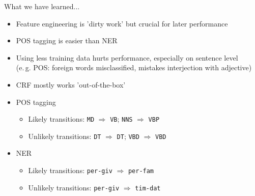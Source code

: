 \begin{frame}{What we have learned...}{}
	\begin{itemize}
		\item Feature engineering is 'dirty work' but crucial for later performance
		\item POS tagging is easier than NER
		\item Using less training data hurts performance, especially on sentence level \\
			(e.\,g. POS: foreign words misclassified, mistakes interjection with adjective)
		\item CRF mostly works 'out-of-the-box'
		\item POS tagging
		\begin{itemize}
			\item Likely transitions: \texttt{MD} $\Rightarrow$ \texttt{VB}; \texttt{NNS} $\Rightarrow$ \texttt{VBP}
			\item Unlikely transitions: \texttt{DT} $\Rightarrow$ \texttt{DT}; \texttt{VBD} $\Rightarrow$ \texttt{VBD}
		\end{itemize}
		\item NER
		\begin{itemize}
			\item Likely transitions: \texttt{per-giv} $\Rightarrow$ \texttt{per-fam}
			\item Unlikely transitions: \texttt{per-giv} $\Rightarrow$ \texttt{tim-dat}
		\end{itemize}
	\end{itemize}
\end{frame}


\makethanks

